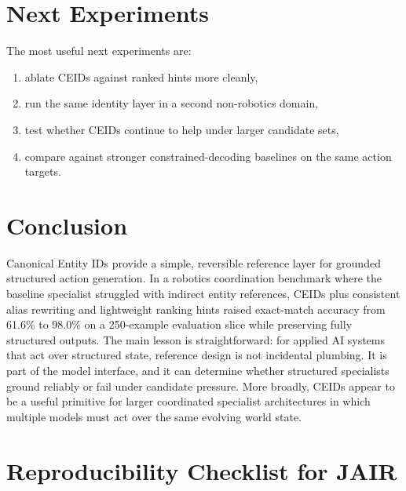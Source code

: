 \documentclass[manuscript,screen,review]{jair}
\begin{document}
\section{Next Experiments}
The most useful next experiments are:
\begin{enumerate}[leftmargin=*,itemsep=0.25em]
  \item ablate CEIDs against ranked hints more cleanly,
  \item run the same identity layer in a second non-robotics domain,
  \item test whether CEIDs continue to help under larger candidate sets,
  \item compare against stronger constrained-decoding baselines on the same action targets.
\end{enumerate}

\section{Conclusion}
Canonical Entity IDs provide a simple, reversible reference layer for grounded structured action generation. In a robotics coordination benchmark where the baseline specialist struggled with indirect entity references, CEIDs plus consistent alias rewriting and lightweight ranking hints raised exact-match accuracy from 61.6\% to 98.0\% on a 250-example evaluation slice while preserving fully structured outputs. The main lesson is straightforward: for applied AI systems that act over structured state, reference design is not incidental plumbing. It is part of the model interface, and it can determine whether structured specialists ground reliably or fail under candidate pressure. More broadly, CEIDs appear to be a useful primitive for larger coordinated specialist architectures in which multiple models must act over the same evolving world state.

\printbibliography

\appendix

\section{Reproducibility Checklist for JAIR}
\end{document}
